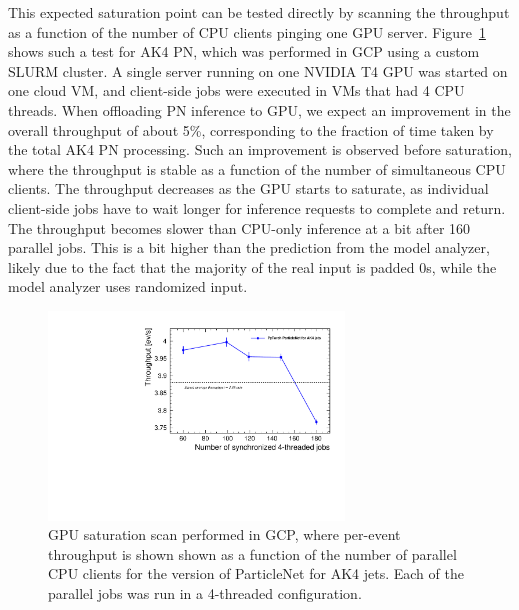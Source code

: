 This expected saturation point can be tested directly by scanning the throughput as a function of the number of CPU clients pinging one GPU server. Figure~\ref{fig:throughputs_scan_pn} shows such a test for AK4 PN, which was performed in GCP using a custom SLURM cluster. A single server running on one NVIDIA T4 GPU was started on one cloud VM, and client-side jobs were executed in VMs that had 4 CPU threads.
When offloading PN inference to GPU, we expect an improvement in the overall throughput of about 5\%, corresponding to the fraction of time taken by the total AK4 PN processing. Such an improvement is observed before saturation, where the throughput is stable as a function of the number of simultaneous CPU clients. The throughput decreases as the GPU starts to saturate, as individual client-side jobs have to wait longer for inference requests to complete and return. The throughput becomes slower than CPU-only inference at a bit after 160 parallel jobs.  This is a bit higher than the prediction from the model analyzer, likely due to the fact that the majority of the real input is padded 0s, while the model analyzer uses randomized input.
\begin{figure}[ht]
    \centering
    \includegraphics[width=0.70\textwidth]{plots/PN_throughput_scan_PT.pdf}
    \caption{GPU saturation scan performed in GCP, where per-event throughput is shown shown as a function of the number of parallel CPU clients for the \PYTORCH version of ParticleNet for AK4 jets. Each of the parallel jobs was run in a 4-threaded configuration.}
    \label{fig:throughputs_scan_pn}
\end{figure}

